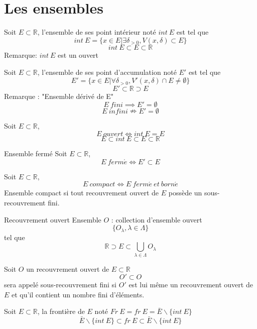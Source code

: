 \section{Les ensembles}
	\begin{mydef}
		Soit $E\subset\mathbb{R}$, l'ensemble de ses point intérieur noté $int~E$ est tel que \[int~E=\{x\in E | \exists\delta_{>0}, V(x,\delta)\subset E\}\]
		\[int~E\subset E\subset\mathbb{R}\]
		Remarque: $int~E$ est un ouvert 
	\end{mydef}
	\begin{mydef}
			Soit $E\subset\mathbb{R}$, l'ensemble de ses point d'accumulation noté $E'$  est tel que \[E'=\{x\in E | \forall\delta_{>0}, V'(x,\delta)\cap E\neq\emptyset\}\]
		\[E'\subset\mathbb{R}\supset E\]
		Remarque : "Ensemble dérivé de E"
		\[E~fini \implies E' =\emptyset\]
		\[E~infini \nRightarrow E'=\emptyset\]
	\end{mydef}
	\begin{mydef}
		Soit $E\subset\mathbb{R}$,
		\[E~ouvert \Longleftrightarrow int~E=E\]
		\[E \subset int~E\subset E\subset\mathbb{R}\]
	\end{mydef}
	\begin{mydef}{Ensemble fermé}
		Soit $E\subset\mathbb{R}$,
			\[E~ferm\acute{e}\Longleftrightarrow E'\subset E\]
	\end{mydef}
	\begin{mydef}
		Soit $E\subset\mathbb{R}$,
		\[E~compact \Longleftrightarrow E~ferm\acute{e}~et~born\acute{e}\]
		Ensemble compact si tout recouvrement ouvert de $E$ possède un sous-recouvrement fini.
	\end{mydef}
	\begin{mydef}{Recouvrement ouvert}
		Ensemble $O$ : collection d'ensemble ouvert \[\{O_{\lambda}, \lambda\in\Lambda\}\] tel que \[\mathbb{R}\supset E\subset \bigcup_{\lambda\in\Lambda}O_{\lambda}\]
	\end{mydef}
	\begin{mythm}
		Soit $O$ un recouvrement ouvert de $E\subset\mathbb{R}$\[O'\subset O\]
		sera appelé sous-recouvrement fini si $O'$ est lui même un recouvrement ouvert de $E$ et qu'il contient un nombre fini d'éléments.
	\end{mythm}
	\begin{mydef}
		Soit $E\subset\mathbb{R}$, la frontière de $E$ noté $Fr~E=fr~E=\bar{E}\backslash\{int~E\}$
		\[\bar{E}\backslash\{int~E\}\subset fr~E\subset \bar{E}\backslash\{int~E\}\] 
	\end{mydef}